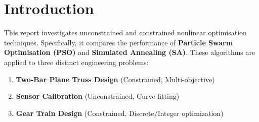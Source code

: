 \section{Introduction}
This report investigates unconstrained and constrained nonlinear optimisation techniques. Specifically, it compares the performance of \textbf{Particle Swarm Optimisation (PSO)} and \textbf{Simulated Annealing (SA)}. These algorithms are applied to three distinct engineering problems:
\begin{enumerate}
    \item \textbf{Two-Bar Plane Truss Design} (Constrained, Multi-objective)
    \item \textbf{Sensor Calibration} (Unconstrained, Curve fitting)
    \item \textbf{Gear Train Design} (Constrained, Discrete/Integer optimization)
\end{enumerate}
